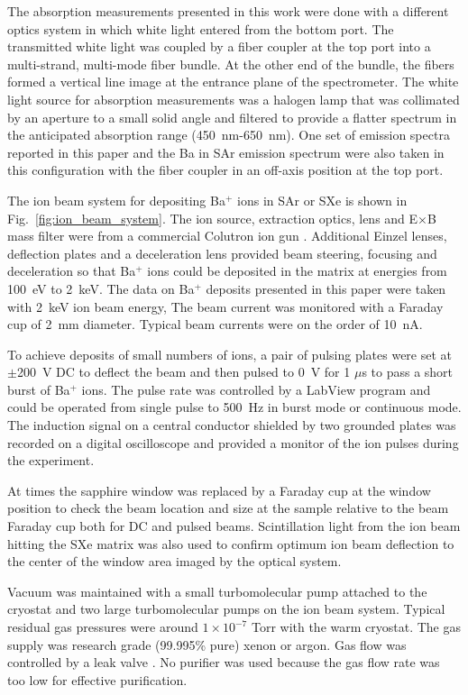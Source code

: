 \documentclass[aps,pra,reprint,superscriptaddress]{revtex4-1}
\begin{document}
The absorption measurements presented in this work were done with a different optics system in which white light entered from the bottom port.
The transmitted white light was coupled by a fiber coupler at the top port into a multi-strand, multi-mode fiber bundle.
At the other end of the bundle, the fibers formed a vertical line image at the entrance plane of the spectrometer.
The white light source for absorption measurements was a halogen lamp that was collimated by an aperture to a small solid angle and filtered to provide a flatter spectrum in the anticipated absorption range (450~nm-650~nm).
One set of emission spectra reported in this paper and the Ba in SAr emission spectrum were also taken in this configuration with the fiber coupler in an off-axis position at the top port.

The ion beam system for depositing Ba$^+ $ ions in SAr or SXe is shown in Fig.~\ref{fig:ion_beam_system}.
The ion source, extraction optics, lens and E$\times$B mass filter were from a commercial Colutron ion gun \cite{Colutron}.
Additional Einzel lenses, deflection plates and a deceleration lens provided beam steering, focusing and deceleration so that Ba$^+ $ ions could be deposited in the matrix at energies from 100~eV to 2~keV.
The data on Ba$^+$ deposits presented in this paper were taken with 2~keV ion beam energy,
The beam current was monitored with a Faraday cup of 2~mm diameter.
Typical beam currents were on the order of 10~nA.


To achieve deposits of small numbers of ions, a pair of pulsing plates were set at $\pm$200~V DC to deflect the beam and then pulsed to 0~V for 1 $\mu$s to pass a short burst of Ba$^+ $ ions.
The pulse rate was controlled by a LabView program and could be operated from single pulse to 500~Hz in burst mode or continuous mode.
The induction signal on a central conductor shielded by two grounded plates was recorded on a digital oscilloscope and provided a monitor of the ion pulses during the experiment.

At times the sapphire window was replaced by a Faraday cup at the window position to check the beam location and size at the sample relative to the beam Faraday cup both for DC and pulsed beams.
Scintillation light from the ion beam hitting the SXe matrix was also used to confirm optimum ion beam deflection to the center of the window area imaged by the optical system.

Vacuum was maintained with a small turbomolecular pump attached to the cryostat and two large turbomolecular pumps on the ion beam system.  Typical residual gas pressures were around $ 1 \! \times \! 10^{-7} $ Torr with the warm cryostat. 
The gas supply was research grade (99.995\% pure) xenon or argon.
Gas flow was controlled by a leak valve \cite{Granville-Phillips}.
No purifier was used because the gas flow rate was too low for effective purification. 
\end{document}
